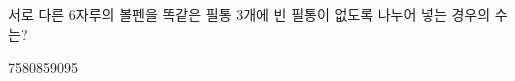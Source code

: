 \hspace*{2mm}\begin{minipage}[t]{\dimexpr\linewidth-2mm\relax}\vspace{0pt}
서로 다른 $6$자루의 볼펜을 똑같은 필통 $3$개에 빈 필통이 없도록 나누어 넣는 경우의 수는?
\begin{choices32}{75}{80}{85}{90}{95}\end{choices32}\end{minipage}
